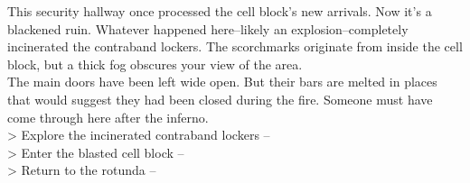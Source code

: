 This security hallway once processed the cell block’s new arrivals. Now it’s a blackened ruin. Whatever happened here--likely an explosion--completely incinerated the contraband lockers. The scorchmarks originate from inside the cell block, but a thick fog obscures your view of the area.\\

The main doors have been left wide open. But their bars are melted in places that would suggest they had been closed during the fire. Someone must have come through here after the inferno.\\

> Explore the incinerated contraband lockers -- \\
> Enter the blasted cell block -- \\
> Return to the rotunda -- 